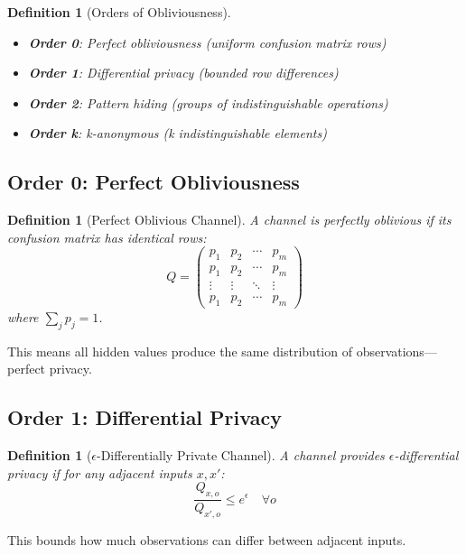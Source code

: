 \documentclass[11pt,final]{article}
\newtheorem{definition}[theorem]{Definition}
\begin{document}
\begin{definition}[Orders of Obliviousness]
\begin{itemize}
\item \textbf{Order 0}: Perfect obliviousness (uniform confusion matrix rows)
\item \textbf{Order 1}: Differential privacy (bounded row differences)
\item \textbf{Order 2}: Pattern hiding (groups of indistinguishable operations)
\item \textbf{Order k}: k-anonymous (k indistinguishable elements)
\end{itemize}
\end{definition}

\subsection{Order 0: Perfect Obliviousness}

\begin{definition}[Perfect Oblivious Channel]
A channel is perfectly oblivious if its confusion matrix has identical rows:
\begin{equation}
Q = \begin{pmatrix}
p_1 & p_2 & \cdots & p_m \\
p_1 & p_2 & \cdots & p_m \\
\vdots & \vdots & \ddots & \vdots \\
p_1 & p_2 & \cdots & p_m
\end{pmatrix}
\end{equation}
where $\sum_j p_j = 1$.
\end{definition}

This means all hidden values produce the same distribution of observations—perfect privacy.

\subsection{Order 1: Differential Privacy}

\begin{definition}[$\epsilon$-Differentially Private Channel]
A channel provides $\epsilon$-differential privacy if for any adjacent inputs $x, x'$:
\begin{equation}
\frac{Q_{x,o}}{Q_{x',o}} \leq e^\epsilon \quad \forall o
\end{equation}
\end{definition}

This bounds how much observations can differ between adjacent inputs.
\end{document}
